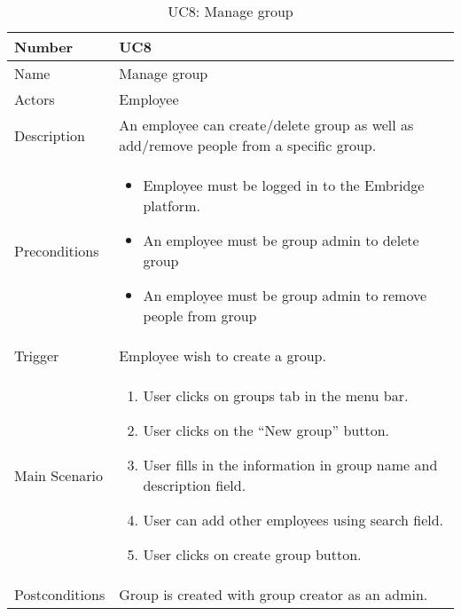 \documentclass[12pt,a4paper]{article}
\begin{document}
\begin{table}[h]
\centering
\caption{UC8: Manage group}
\label{tab:uc8}
\begin{tabularx}{\textwidth}{@{}lX@{}}
\toprule

Number & UC8 \\ \midrule
Name & Manage group \\
Actors & Employee\\
Description & An employee can create/delete group as well as add/remove people from a specific group.
 \\
Preconditions & 
\begin{itemize}
\item Employee must be logged in to the Embridge platform.
\item An employee must be group admin to delete group
\item An employee must be group admin to remove people from group 
\end{itemize}
 \\
 Trigger & Employee wish to create a group.\\

Main Scenario & 
\begin{enumerate}
\item User clicks on groups tab in the menu bar.
\item User clicks on the “New group” button.
\item User fills in the information in group name and description field.
\item User can add other employees using search field.
\item User clicks on create group button.
\end{enumerate}
 \\
Postconditions & Group is created with group creator as an admin. \\
\bottomrule
\end{tabularx}
\end{table}
\end{document}
